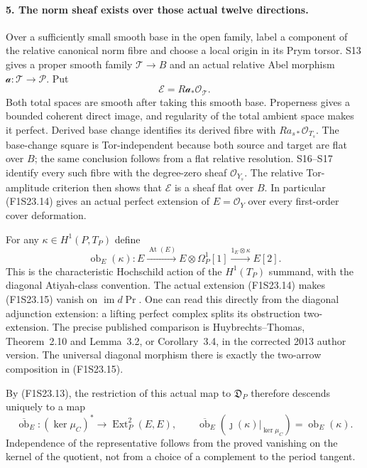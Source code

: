 \paragraph{5. The norm sheaf exists over those actual twelve directions.}
Over a sufficiently small smooth base in the open family, label a
component of the relative canonical norm fibre and choose a local
origin in its Prym torsor. S13 gives a proper smooth family
$\mathcal T\to B$ and an actual relative Abel morphism
$\mathcal a:\mathcal T\to\mathcal P$. Put
\[
                 \mathcal E=R\mathcal a_*\mathcal O_{\mathcal T}.
 \tag{F1S23.14}
\]
Both total spaces are smooth after taking this smooth base.
Properness gives a bounded coherent direct image, and regularity
of the total ambient space makes it perfect. Derived base change
identifies its derived fibre with
$Ra_{s*}\mathcal O_{T_s}$. The base-change square is
Tor-independent because both source and target are flat over
$B$; the same conclusion follows from a flat relative resolution.
S16--S17 identify every such fibre with the degree-zero sheaf
$\mathcal O_{Y_s}$. The relative Tor-amplitude criterion then
shows that $\mathcal E$ is a sheaf flat over $B$.
In particular (F1S23.14) gives an actual perfect extension of
$E=\mathcal O_Y$ over every first-order cover deformation.

For any $\kappa\in H^1(P,T_P)$ define
\[
 \operatorname{ob}_E(\kappa):
 E\xrightarrow{\operatorname{At}(E)}E\otimes\Omega_P^1[1]
  \xrightarrow{1_E\otimes\kappa}E[2].
 \tag{F1S23.15}
\]
This is the characteristic Hochschild action of the
$H^1(T_P)$ summand, with the diagonal Atiyah-class convention.
The actual extension (F1S23.14) makes (F1S23.15) vanish on
$\operatorname{im}d\operatorname{Pr}$. One can read this
directly from the diagonal adjunction extension: a lifting
perfect complex splits its obstruction two-extension.
The precise published comparison is Huybrechts--Thomas,
Theorem~2.10 and Lemma~3.2, or Corollary~3.4, in the corrected
2013 author version. The universal diagonal morphism there
is exactly the two-arrow composition in (F1S23.15).

By (F1S23.13), the restriction of this actual map to
$\mathfrak D_P$ therefore descends uniquely to a map
\[
          \overline{\operatorname{ob}}_E:
             (\ker\mu_C)^*\longrightarrow\operatorname{Ext}^2_P(E,E),
 \qquad
 \overline{\operatorname{ob}}_E(\jmath(\kappa)|_{\ker\mu_C})
                          =\operatorname{ob}_E(\kappa).
 \tag{F1S23.16}
\]
Independence of the representative follows from the proved
vanishing on the kernel of the quotient, not from a choice of
a complement to the period tangent.


